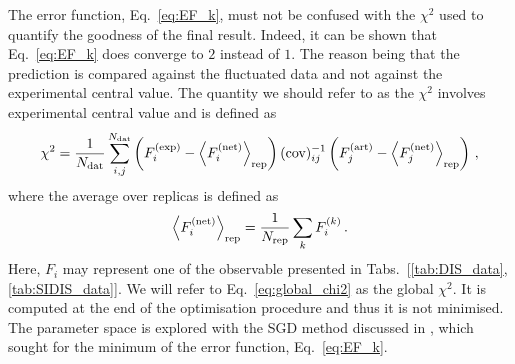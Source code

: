 The error function, Eq.~\eqref{eq:EF_k}, must not be confused with the $\chi^2$ used to quantify the goodness of the final result. Indeed, it can be shown that Eq.~\eqref{eq:EF_k} does converge to $2$ instead of $1$. The reason being that the prediction is compared against the fluctuated data and not against the experimental central value. The quantity we should refer to as the $\chi^2$ involves 
experimental central value and is defined as
\begin{equation}
  \chi^2 = \frac{1}{N_{\textrm{dat}}} \sum_{i,j}^{N_{\textrm{dat}}} \left( F_{i}^{\textrm{(exp)}} - \left<F_{i}^{\textrm{(net)}}\right>_{\textrm{rep}} \right) (\textrm{cov})^{-1}_{ij} \left( F_{j}^{\textrm{(art)}} - \left<F_{j}^{\textrm{(net)}}\right>_{\textrm{rep}} \right) \,,
  \label{eq:global_chi2}
\end{equation}
where the average over replicas is defined as
\begin{equation}
  \left< F_i^{\textrm{(net)}} \right>_{\textrm{rep}} = \frac{1}{N_{\textrm{rep}}} \sum_{k} F^{(k)}_i \,.
\end{equation}
Here, $F_i$ may represent one of the observable presented in Tabs.~[\ref{tab:DIS_data},\ref{tab:SIDIS_data}]. We will refer to Eq.~\eqref{eq:global_chi2} as the global $\chi^2$. It is computed at the end of the optimisation procedure and thus it is not minimised. The parameter space is explored with the SGD method discussed in , which sought for the minimum of the error function, Eq.~\eqref{eq:EF_k}.%

